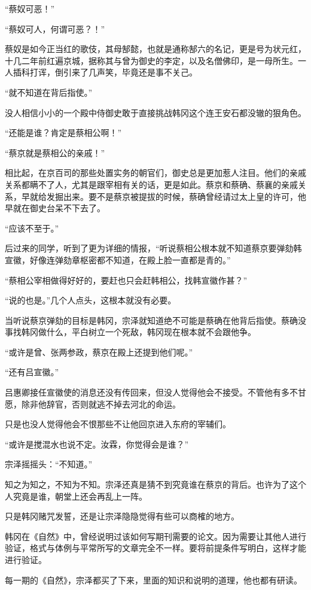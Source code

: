 “蔡奴可恶！”

“蔡奴可人，何谓可恶？！”

蔡奴是如今正当红的歌伎，其母郜懿，也就是通称郜六的名记，更是号为状元红，十几二年前红遍京城，据称其与曾为御史的李定，以及名僧佛印，是一母所生。一人插科打诨，倒引来了几声笑，毕竟还是事不关己。

“就不知道在背后指使。”

没人相信小小的一个殿中侍御史敢于直接挑战韩冈这个连王安石都没辙的狠角色。

“还能是谁？肯定是蔡相公啊！”

“蔡京就是蔡相公的亲戚！”

相比起，在京百司的那些处置实务的朝官们，御史总是更加惹人注目。他们的亲戚关系都瞒不了人，尤其是跟宰相有关的话，更是如此。蔡京和蔡确、蔡襄的亲戚关系，早就给发掘出来。要不是蔡京被提拔的时候，蔡确曾经请过太上皇的许可，他早就在御史台呆不下去了。

“应该不至于。”

后过来的同学，听到了更为详细的情报，“听说蔡相公根本就不知道蔡京要弹劾韩宣徽，好像连弹劾章枢密都不知道，在殿上脸一直都是青的。”

“蔡相公宰相做得好好的，要赶也只会赶韩相公，找韩宣徽作甚？”

“说的也是。”几个人点头，这根本就没有必要。

当听说蔡京弹劾的目标是韩冈，宗泽就知道绝不可能是蔡确在他背后指使。蔡确没事找韩冈做什么，平白树立一个死敌，韩冈现在根本就不会跟他争。

“或许是曾、张两参政，蔡京在殿上还提到他们呢。”

“还有吕宣徽。”

吕惠卿接任宣徽使的消息还没有传回来，但没人觉得他会不接受。不管他有多不甘愿，除非他辞官，否则就逃不掉去河北的命运。

只是也没人觉得他会不恨那些不让他回京进入东府的宰辅们。

“或许是搅混水也说不定。汝霖，你觉得会是谁？”

宗泽摇摇头：“不知道。”

知之为知之，不知为不知。宗泽还真是猜不到究竟谁在蔡京的背后。也许为了这个人究竟是谁，朝堂上还会再乱上一阵。

只是韩冈赌咒发誓，还是让宗泽隐隐觉得有些可以商榷的地方。

韩冈在《自然》中，曾经说明过该如何写期刊需要的论文。因为需要让其他人进行验证，格式与体例与平常所写的文章完全不一样。要将前提条件写明白，这样才能进行验证。

每一期的《自然》，宗泽都买了下来，里面的知识和说明的道理，他也都有研读。

